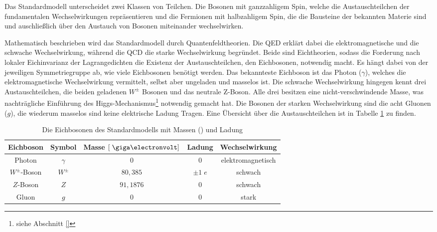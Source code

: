 Das Standardmodell unterscheidet zwei Klassen von Teilchen. Die Bosonen mit
ganzzahligem Spin, welche die Austauschteilchen der fundamentalen
Wechselwirkungen repräsentieren und die Fermionen mit halbzahligem Spin, die
die Bausteine der bekannten Materie sind und auschließlich über den Austauch
von Bosonen miteinander wechselwirken.  

Mathematisch beschrieben wird das Standardmodell durch Quantenfeldtheorien. Die
\ac{QED} erklärt dabei die elektromagnetische und die schwache Wechselwirkung,
während die \ac{QCD} die starke Wechselwirkung begründet. Beide sind
Eichtheorien, sodass die Forderung nach lokaler Eichinvarianz der
Lagrangedichten die Existenz der Austauschteilchen, den Eichbosonen, notwendig
macht. Es hängt dabei von der jeweiligen Symmetriegruppe ab, wie viele
Eichbosonen benötigt werden. Das bekannteste Eichboson ist das Photon
($\gamma$), welches die elektromagnetische Wechselwirkung vermittelt, selbst
aber ungeladen und masselos ist. Die schwache Wechselwirkung hingegen kennt
drei Austauschteilchen, die beiden geladenen $W^\pm$ Bosonen und das neutrale
Z-Boson. Alle drei besitzen eine nicht-verschwindende Masse, was nachträgliche
Einführung des Higgs-Mechanismus\footnote{siehe Abschnitt \ref{}}
notwendig gemacht hat. Die Bosonen der starken Wechselwirkung sind die acht
Gluonen ($g$), die wiederum masselos sind keine elektrische Ladung Tragen. Eine
Übersicht über die Austauschteilchen ist in Tabelle \ref{tab:bosons} zu finden.

\begin{table}
    \centering
    \begin{tabular}{|c|c|c|c|c|}
        \hline
        \bf{Eichboson} & \bf{Symbol} & \bf{Masse} $[\GeV]$ & \bf{Ladung} &
        \bf{Wechselwirkung} \\
        \hline\hline
        Photon        & $\gamma$ & $0$       & $0$        & elektromagnetisch \\
        $W^\pm$-Boson & $W^\pm$  & $80,385 $ & $\pm 1\;e$ & schwach \\
        $Z$-Boson     & $Z$      & $91,1876$ & $0$        & schwach \\
        Gluon         & $g$      & $0$       & $0$        & stark \\
        \hline
    \end{tabular}
    \caption[Die Eichbosonen des Standardmodells]
        {Die Eichbosonen des Standardmodells mit Massen
        (\cite{PhysRevD.86.010001}) und Ladung}
    \label{tab:bosons}
\end{table}

